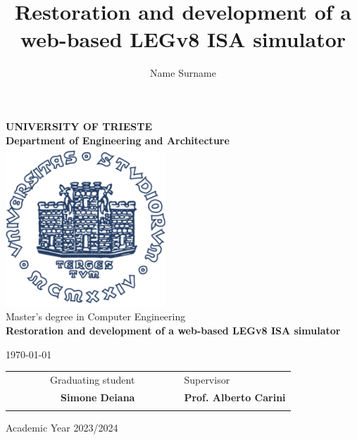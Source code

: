 \title{Restoration and development of a web-based LEGv8 ISA simulator}
\author{Name Surname}

\begin{titlepage}
    \begin{center}
    \BgThispage
    {\LARGE {\bfseries UNIVERSITY OF TRIESTE \\}}
    \vspace{.5cm}
    {\Large {\bfseries Department of Engineering and Architecture \\}}
    \vspace{1cm}
    \includegraphics[width=6cm,height=6cm]{img/units_logo.pdf}\\[1.5cm]

    {\LARGE
        Master's degree in Computer Engineering \\
    }
    \vspace{1cm}
    {\LARGE 
        {\bfseries Restoration and development of a web-based LEGv8 ISA simulator}
    }
    \vspace{1cm}

    {\large \today \\
    }

    \vfill
    \begin{table}[h]
        {\large
            \begin{tabular}{c c c c r c c | c c l}
                & & & & Graduating student & & & & & Supervisor \\
                & & & & \bfseries Simone Deiana & & & & & \bfseries Prof. Alberto Carini \\ %
                & & & & & & & & & \\
            \end{tabular}
        }
    \end{table}
    Academic Year 2023/2024
    \end{center}
\end{titlepage}